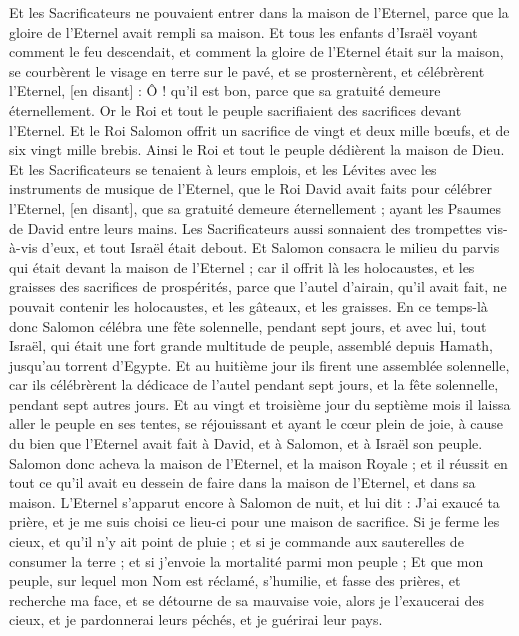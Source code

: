 \begin{multicols}{2}
Et les Sacrificateurs ne pouvaient entrer dans la maison de l'Eternel, parce que la gloire de l'Eternel avait rempli sa maison.
Et tous les enfants d'Israël voyant comment le feu descendait, et comment la gloire de l'Eternel était sur la maison, se courbèrent le visage en terre sur le pavé, et se prosternèrent, et célébrèrent l'Eternel, [en disant] : Ô ! qu'il est bon, parce que sa gratuité demeure éternellement.
Or le Roi et tout le peuple sacrifiaient des sacrifices devant l'Eternel.
Et le Roi Salomon offrit un sacrifice de vingt et deux mille bœufs, et de six vingt mille brebis. Ainsi le Roi et tout le peuple dédièrent la maison de Dieu.
Et les Sacrificateurs se tenaient à leurs emplois, et les Lévites avec les instruments de musique de l'Eternel, que le Roi David avait faits pour célébrer l'Eternel, [en disant], que sa gratuité demeure éternellement ; ayant les Psaumes de David entre leurs mains. Les Sacrificateurs aussi sonnaient des trompettes vis-à-vis d'eux, et tout Israël était debout.
Et Salomon consacra le milieu du parvis qui était devant la maison de l'Eternel ; car il offrit là les holocaustes, et les graisses des sacrifices de prospérités, parce que l'autel d'airain, qu'il avait fait, ne pouvait contenir les holocaustes, et les gâteaux, et les graisses.
En ce temps-là donc Salomon célébra une fête solennelle, pendant sept jours, et avec lui, tout Israël, qui était une fort grande multitude de peuple, assemblé depuis Hamath, jusqu'au torrent d'Egypte.
Et au huitième jour ils firent une assemblée solennelle, car ils célébrèrent la dédicace de l'autel pendant sept jours, et la fête solennelle, pendant sept autres jours.
Et au vingt et troisième jour du septième mois il laissa aller le peuple en ses tentes, se réjouissant et ayant le cœur plein de joie, à cause du bien que l'Eternel avait fait à David, et à Salomon, et à Israël son peuple.
Salomon donc acheva la maison de l'Eternel, et la maison Royale ; et il réussit en tout ce qu'il avait eu dessein de faire dans la maison de l'Eternel, et dans sa maison.
L'Eternel s'apparut encore à Salomon de nuit, et lui dit : J'ai exaucé ta prière, et je me suis choisi ce lieu-ci pour une maison de sacrifice.
Si je ferme les cieux, et qu'il n'y ait point de pluie ; et si je commande aux sauterelles de consumer la terre ; et si j'envoie la mortalité parmi mon peuple ;
Et que mon peuple, sur lequel mon Nom est réclamé, s'humilie, et fasse des prières, et recherche ma face, et se détourne de sa mauvaise voie, alors je l'exaucerai des cieux, et je pardonnerai leurs péchés, et je guérirai leur pays.

\end{multicols}
